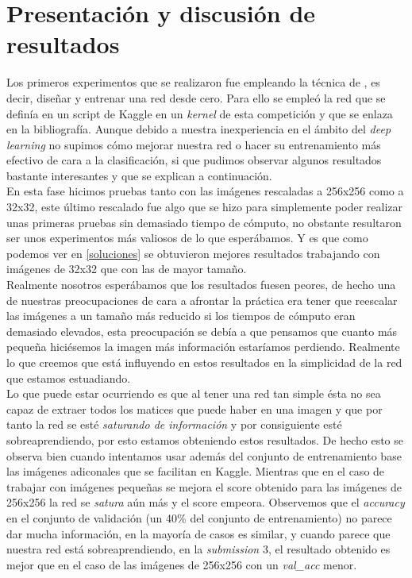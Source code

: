 \section{Presentación y discusión de resultados}

Los primeros experimentos que se realizaron fue empleando la técnica de , es decir, diseñar y entrenar una red desde cero. Para ello se empleó la red que se definía en un script de Kaggle en un \textit{kernel} de esta competición y que se enlaza en la bibliografía. Aunque debido a nuestra inexperiencia en el ámbito del \textit{deep learning} no supimos cómo mejorar nuestra red o hacer su entrenamiento más efectivo de cara a la clasificación, si que pudimos observar algunos resultados bastante interesantes y que se explican a continuación.\\

En esta fase hicimos pruebas tanto con las imágenes rescaladas a 256x256 como a 32x32, este último rescalado fue algo que se hizo para simplemente poder realizar unas primeras pruebas sin demasiado tiempo de cómputo, no obstante resultaron ser unos experimentos más valiosos de lo que esperábamos. Y es que como podemos ver en \autoref{soluciones} se obtuvieron mejores resultados trabajando con imágenes de 32x32 que con las de mayor tamaño.\\

Realmente nosotros esperábamos que los resultados fuesen peores, de hecho una de nuestras preocupaciones de cara a afrontar la práctica era tener que reescalar las imágenes a un tamaño más reducido si los tiempos de cómputo eran demasiado elevados, esta preocupación se debía a que pensamos que cuanto más pequeña hiciésemos la imagen más información estaríamos perdiendo. Realmente lo que creemos que está influyendo en estos resultados en la simplicidad de la red que estamos estuadiando.\\

Lo que puede estar ocurriendo es que al tener una red tan simple ésta no sea capaz de extraer todos los matices que puede haber en una imagen y que por tanto la red se esté \textit{saturando de información} y por consiguiente esté sobreaprendiendo, por esto estamos obteniendo estos resultados. De hecho esto se observa bien cuando intentamos usar además del conjunto de entrenamiento base las imágenes adiconales que se facilitan en Kaggle. Mientras que en el caso de trabajar con imágenes pequeñas se mejora el score obtenido para las imágenes de 256x256 la red se \textit{satura} aún más y el score empeora. Observemos que el \textit{accuracy} en el conjunto de validación (un 40\% del conjunto de entrenamiento) no parece dar mucha información, en la mayoría de casos es similar, y cuando parece que nuestra red está sobreaprendiendo, en la \textit{submission} 3, el resultado obtenido es mejor que en el caso de las imágenes de 256x256 con un \textit{val\_acc} menor.\\

